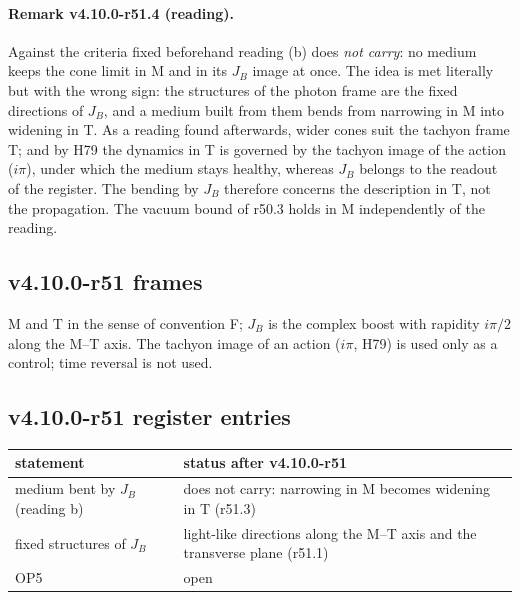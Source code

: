 \paragraph{Remark v4.10.0-r51.4 (reading).}
Against the criteria fixed beforehand reading (b) does \emph{not carry}: no medium keeps the cone limit in M and in its \(J_B\) image at once.  The idea is
met literally but with the wrong sign: the structures of the photon frame are the fixed directions of \(J_B\), and a medium built from them bends from
narrowing in M into widening in T.  As a reading found afterwards, wider cones suit the tachyon frame T; and by H79 the dynamics in T is governed by
the tachyon image of the action (\(i\pi\)), under which the medium stays healthy, whereas \(J_B\) belongs to the readout of the register.  The bending by \(J_B\)
therefore concerns the description in T, not the propagation.  The vacuum bound of r50.3 holds in M independently of the reading.

\subsection*{v4.10.0-r51 frames}
\label{subsec:v4100-r51-frames}

M and T in the sense of convention F; \(J_B\) is the complex boost with rapidity \(i\pi/2\) along the M--T axis.  The tachyon image of an action (\(i\pi\), H79) is used only
as a control; time reversal is not used.

\subsection*{v4.10.0-r51 register entries}
\label{subsec:v4100-r51-register}

\begin{center}
\small
\begin{tabular}{@{}>{\raggedright\arraybackslash}p{}>{\raggedright\arraybackslash}p{}@{}}
\toprule
statement & status after v4.10.0-r51\\
\midrule
medium bent by \(J_B\) (reading b) & does not carry: narrowing in M becomes widening in T (r51.3)\\
fixed structures of \(J_B\) & light-like directions along the M--T axis and the transverse plane (r51.1)\\
OP5 & open\\
\bottomrule
\end{tabular}
\end{center}

